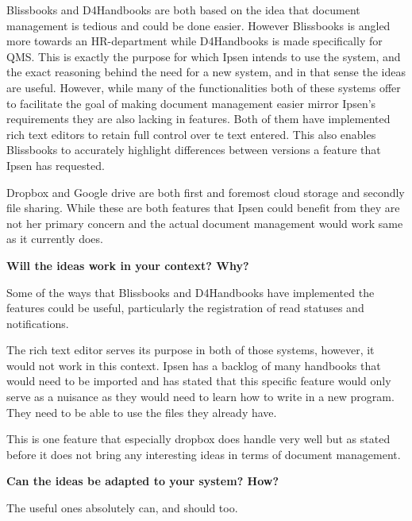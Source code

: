 Blissbooks and D4Handbooks are both based on the idea that document management is tedious and could be done easier.
However Blissbooks is angled more towards an HR-department while D4Handbooks is made specifically for QMS.
This is exactly the purpose for which Ipsen intends to use the system, and the exact reasoning behind the need for a new system, and in that sense the ideas are useful.
However, while many of the functionalities both of these systems offer to facilitate the goal of making document management easier mirror Ipsen's requirements they are also lacking in features.
Both of them have implemented rich text editors to retain full control over te text entered. 
This also enables Blissbooks to accurately highlight differences between versions a feature that Ipsen has requested.

Dropbox and Google drive are both first and foremost cloud storage and secondly file sharing. 
While these are both features that Ipsen could benefit from they are not her primary concern and the actual document management would work same as it currently does.

\textbf{Will the ideas work in your context? Why?}

Some of the ways that Blissbooks and D4Handbooks have implemented the features could be useful, particularly the registration of read statuses and notifications.

The rich text editor serves its purpose in both of those systems, however, it would not work in this context.
Ipsen has a backlog of many handbooks that would need to be imported and has stated that this specific feature would only serve as a nuisance as they would need to learn how to write in a new program.
They need to be able to use the files they already have.

This is one feature that especially dropbox does handle very well but as stated before it does not bring any interesting ideas in terms of document management.

\textbf{Can the ideas be adapted to your system? How?}

The useful ones absolutely can, and should too.
